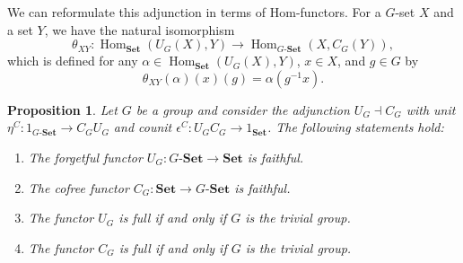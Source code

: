 \documentclass{amsart}
\newtheorem{proposition}{Proposition}
\begin{document}
We can reformulate this adjunction in terms of Hom-functors. 
For a $G$-set $X$ and a set $Y$, we have the natural isomorphism
\[
\theta_{XY} \colon \operatorname{Hom}_{\mathbf{Set}}(U_G(X), Y) 
\longrightarrow \operatorname{Hom}_{G\text{-}\mathbf{Set}}(X, C_G(Y)),
\]
which is defined for any $\alpha \in \operatorname{Hom}_{\mathbf{Set}}(U_G(X), Y)$, 
$x \in X$, and $g \in G$ by
\[
\theta_{XY}(\alpha)(x)(g) = \alpha(g^{-1}x).
\]

\begin{proposition}\label{prop:cofree_faithfulness}
Let $G$ be a group and consider the adjunction $U_G \dashv C_G$ with unit $\eta^C \colon 1_{G\text{-}\mathbf{Set}} \longrightarrow C_G U_G$ and counit $\epsilon^C \colon U_G C_G \longrightarrow 1_{\mathbf{Set}}$. The following statements hold:
\begin{enumerate}
\item The forgetful functor $U_G \colon G\text{-}\mathbf{Set} \longrightarrow \mathbf{Set}$ is faithful.
\item The cofree functor $C_G \colon \mathbf{Set} \longrightarrow G\text{-}\mathbf{Set}$ is faithful.
\item The functor $U_G$ is full if and only if $G$ is the trivial group.
\item The functor $C_G$ is full if and only if $G$ is the trivial group.
\end{enumerate}
\end{proposition}
\end{document}
